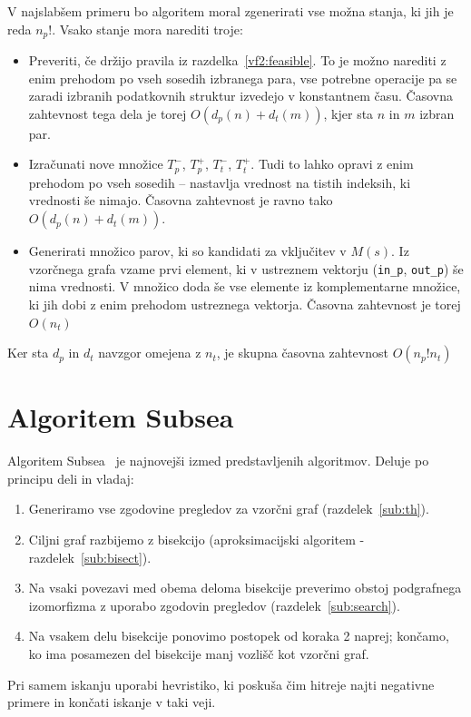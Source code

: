 \documentclass[a4paper, 12pt, ]{book}
\newcommand{\code}[1]{\mbox{\texttt{#1}}}
\begin{document}
	V najslabšem primeru bo algoritem moral zgenerirati vse možna stanja, ki jih je reda $n_p!$. Vsako stanje mora narediti troje:
	\begin{itemize}
	\item Preveriti, če držijo pravila iz razdelka~\ref{vf2:feasible}. To je možno narediti z enim prehodom po vseh sosedih izbranega para, vse
	potrebne operacije pa se zaradi izbranih podatkovnih struktur izvedejo v konstantnem času. Časovna zahtevnost tega dela je torej $O(d_p(n) + d_t(m))$,
	kjer sta $n$ in $m$ izbran par.
	\item Izračunati nove množice $T_p^-$, $T_p^+$, $T_t^-$, $T_t^+$. Tudi to lahko opravi z enim prehodom po vseh sosedih -- nastavlja vrednost
	na tistih indeksih, ki vrednosti še nimajo. Časovna zahtevnost je ravno tako $O(d_p(n) + d_t(m))$.
	\item Generirati množico parov, ki so kandidati za vključitev v $M(s)$. Iz vzorčnega grafa vzame prvi element, ki v ustreznem vektorju (\code{in\_p},
	\code{out\_p}) še nima vrednosti. V množico doda še vse elemente iz komplementarne množice, ki jih dobi z enim prehodom ustreznega vektorja.
	Časovna zahtevnost je torej $O(n_t)$
	\end{itemize}
	Ker sta $d_p$ in $d_t$ navzgor omejena z $n_t$, je skupna časovna zahtevnost $O(n_p!n_t)$






\chapter{Algoritem Subsea}
	Algoritem Subsea~\cite{subsea} je najnovejši izmed predstavljenih algoritmov. Deluje po principu deli in vladaj:
	\begin{enumerate}
		\item Generiramo vse zgodovine pregledov za vzorčni graf (razdelek~\ref{sub:th}).
		\item Ciljni graf razbijemo z bisekcijo (aproksimacijski algoritem - razdelek~\ref{sub:bisect}).
		\item Na vsaki povezavi med obema deloma bisekcije preverimo obstoj podgrafnega izomorfizma z uporabo zgodovin pregledov 
			(razdelek~\ref{sub:search}).
		\item Na vsakem delu bisekcije ponovimo postopek od koraka 2 naprej; končamo, ko ima posamezen del bisekcije manj vozlišč kot vzorčni graf.
	\end{enumerate}
	Pri samem iskanju uporabi hevristiko, ki poskuša čim hitreje najti negativne primere in končati iskanje v taki veji.
	
\end{document}
